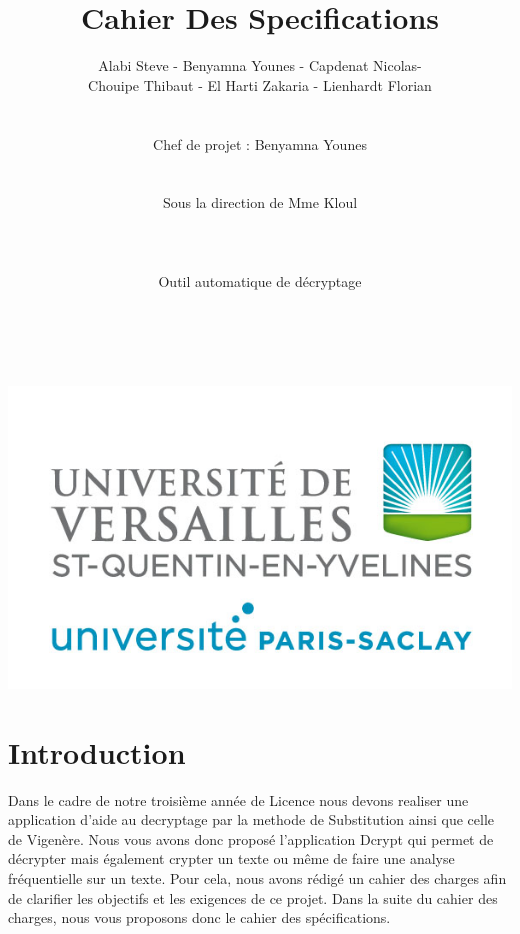\documentclass[a4]{article}
\begin{document}
	\title{\Huge{\textbf{Cahier Des Specifications}}}
	\author{Alabi Steve - Benyamna Younes - Capdenat Nicolas- \\
		Chouipe Thibaut - El Harti Zakaria - Lienhardt Florian \\ \\ \\
		Chef de projet : Benyamna Younes \\ \\ \\ 
		Sous la direction de Mme Kloul \\ \\ \\ \\
		Outil automatique de décryptage \\ \\ \\}
		

	\begin{titlepage}
		\maketitle
		\vspace{20em}
		\begin{center}\includegraphics{logo_uvsq.jpg}\end{center}
	\end{titlepage}
	\section{Introduction}
Dans le cadre de notre troisième année de Licence nous devons realiser une application d'aide au
decryptage par la methode de Substitution ainsi que celle de Vigenère.
Nous vous avons donc proposé l'application Dcrypt qui permet de décrypter 
mais également crypter un texte ou même de faire une analyse fréquentielle sur un texte.
Pour cela, nous avons rédigé un cahier des charges afin de clarifier les objectifs et les 
exigences de ce projet. Dans la suite du cahier des charges, nous vous proposons donc
le cahier des spécifications.
\end{document}
